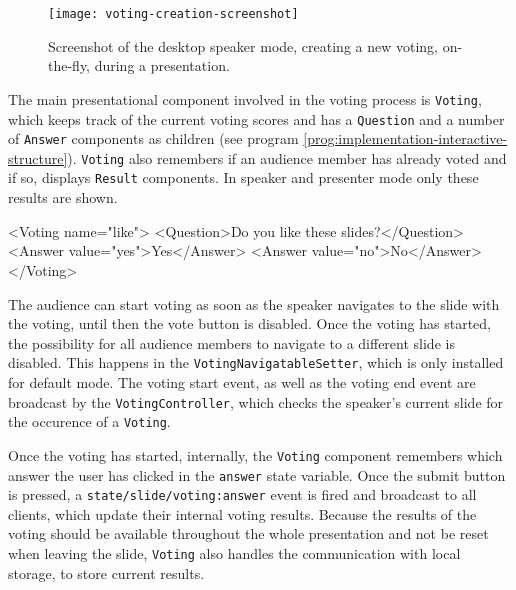 \begin{figure}
\centering
\texttt{[image: voting-creation-screenshot]}
\caption{Screenshot of the desktop speaker mode, creating a new voting, on-the-fly, during a presentation.}
\label{fig:implementation-interactive-voting}
\end{figure}

The main presentational component involved in the voting process is \texttt{Voting}, which keeps track of the current voting scores and has a \texttt{Question} and a number of \texttt{Answer} components as children (see program \ref{prog:implementation-interactive-structure}). \texttt{Voting} also remembers if an audience member has already voted and if so, displays \texttt{Result} components. In speaker and presenter mode only these results are shown.

\begin{program}
\caption{Example code for preparing a slide with voting.}
\label{prog:implementation-interactive-structure}
\begin{JsCode}
<Voting name="like">
  <Question>Do you like these slides?</Question>
  <Answer value="yes">Yes</Answer>
  <Answer value="no">No</Answer>
</Voting>
\end{JsCode}
\end{program}

The audience can start voting as soon as the speaker navigates to the slide with the voting, until then the vote button is disabled. Once the voting has started, the possibility for all audience members to navigate to a different slide is disabled. This happens in the \texttt{VotingNavigatableSetter}, which is only installed for default mode. The voting start event, as well as the voting end event are broadcast by the \texttt{VotingController}, which checks the speaker's current slide for the occurence of a \texttt{Voting}.

Once the voting has started, internally, the \texttt{Voting} component remembers which answer the user has clicked in the \texttt{answer} state variable. Once the submit button is pressed, a \texttt{state/slide/voting:answer} event is fired and broadcast to all clients, which update their internal voting results.
Because the results of the voting should be available throughout the whole presentation and not be reset when leaving the slide, \texttt{Voting} also handles the communication with local storage, to store current results.